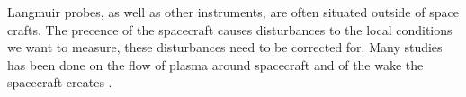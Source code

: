 
Langmuir probes, as well as other instruments, are often situated outside of space crafts.
The precence of the spacecraft causes disturbances to the local conditions we want to measure,
these disturbances need to be corrected for.
Many studies has been done on the flow of plasma around spacecraft and of the wake the
spacecraft creates \citep{miloch_wake_2010,engwall_wake_2006}.
